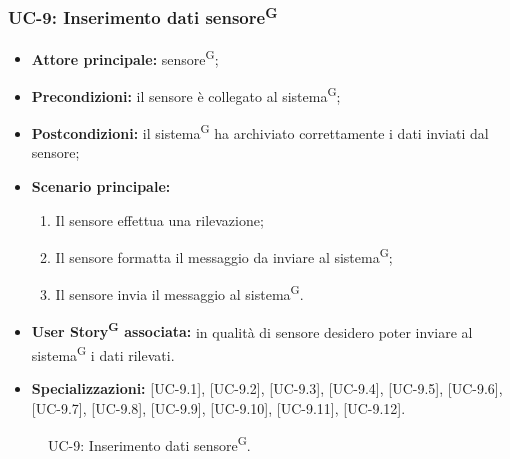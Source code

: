\documentclass[8pt]{article}
\newcommand{\glossterm}[1]{#1\textsuperscript{G}} %
\begin{document}
\subsubsection*{UC-9: Inserimento dati \glossterm{sensore}}
\begin{itemize}
    \item \textbf{Attore principale:} \glossterm{sensore};
    \item \textbf{Precondizioni:} il sensore è collegato al \glossterm{sistema};
    \item \textbf{Postcondizioni:} il \glossterm{sistema} ha archiviato correttamente i dati inviati dal sensore;
    \item \textbf{Scenario principale:}
        \begin{enumerate}
        \item Il sensore effettua una rilevazione;
        \item Il sensore formatta il messaggio da inviare al \glossterm{sistema};
        \item Il sensore invia il messaggio al \glossterm{sistema}.
        \end{enumerate}
    \item \textbf{\glossterm{User Story} associata:} in qualità di sensore desidero poter inviare al \glossterm{sistema} i
        dati rilevati.
    \item \textbf{Specializzazioni:} [UC-9.1], [UC-9.2], [UC-9.3], [UC-9.4], [UC-9.5], [UC-9.6], [UC-9.7], [UC-9.8], [UC-9.9], [UC-9.10], [UC-9.11], [UC-9.12].
\end{itemize}
\begin{figure}[ht!]
    \centering
    \caption{UC-9: Inserimento dati \glossterm{sensore}.}
    \label{fig:UC-9: Inserimento dati sensore}
\end{figure}
\end{document}
